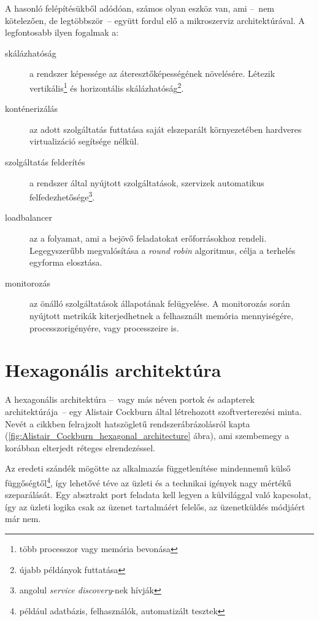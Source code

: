 A hasonló felépítésükből adódóan, számos olyan eszköz van, ami --~nem kötelezően, de legtöbbször~--   együtt fordul elő a mikroszerviz architektúrával. A legfontosabb ilyen fogalmak a:
\begin{description}
	\item[skálázhatóság] a rendszer képessége az áteresztőképességének növelésére.
	Létezik vertikális\footnote{több processzor vagy memória bevonása} és horizontális skálázhatóság\footnote{újabb példányok futtatása}.
	
	\item[konténerizálás] az adott szolgáltatás futtatása saját elszeparált környezetében hardveres virtualizáció segítsége nélkül.	

	\item[szolgáltatás felderítés] a rendszer által nyújtott szolgáltatások, szervizek automatikus
	felfedezhetősége\footnote{angolul \emph{service discovery}-nek hívják}.
	
	\item[loadbalancer] az a folyamat, ami a bejövő feladatokat erőforrásokhoz rendeli. Legegyszerűbb megvalósítása a \foreignlanguage{british}{\emph{round robin}} algoritmus, célja a terhelés egyforma elosztása.
	
	\item[monitorozás] az önálló szolgáltatások állapotának felügyelése. A monitorozás során nyújtott metrikák kiterjedhetnek a felhasznált memória mennyiségére, processzorigényére, vagy processzeire is.
\end{description}


\section{Hexagonális architektúra}\label{sec:hexagonalis_architektura}
A hexagonális architektúra --~vagy más néven portok és adapterek architektúrája~--   egy \foreignlanguage{british}{Alistair Cockburn} által létrehozott \cite{Alistair_Cockburn} szoftverterezési minta. Nevét a cikkben felrajzolt hatszögletű rendszerábrázolásról kapta (\ref{fig:Alistair_Cockburn_hexagonal_architecture} ábra), ami szembemegy a korábban elterjedt réteges elrendezéssel.

Az eredeti szándék mögötte az alkalmazás függetlenítése mindennemű külső függőségtől\footnote{például adatbázis, felhasználók, automatizált tesztek}, így lehetővé téve az üzleti és a technikai igények nagy mértékű szeparálását.
Egy absztrakt port feladata kell legyen a külvilággal való kapcsolat, így az üzleti logika csak az üzenet tartalmáért felelős, az üzenetküldés módjáért már nem.

